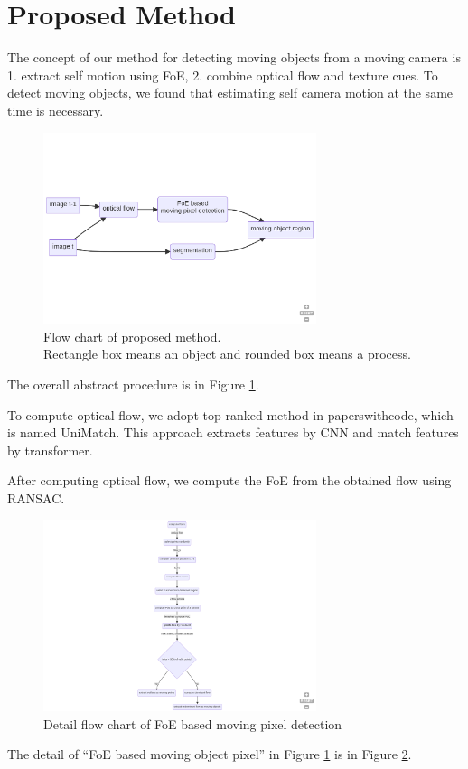 \documentclass[10pt, twocolumn]{article}
\begin{document}
\section{Proposed Method}
The concept of our method for detecting moving objects from a moving camera is 1. extract self motion using FoE, 2. combine optical flow and texture cues.
To detect moving objects, we found that estimating self camera motion at the same time is necessary.
\begin{figure}[ht]
  \centering
  \includegraphics[width=8cm]{fig/wholeflow.png}
  \caption{Flow chart of proposed method.\\
    Rectangle box means an object and rounded box means a process.}
  \label{fig:wholeflow}
\end{figure}
The overall abstract procedure is in Figure \ref{fig:wholeflow}.

To compute optical flow, we adopt top ranked method in paperswithcode, which is named UniMatch\cite{xu2022unifying}.
This approach extracts features by CNN and match features by transformer.

After computing optical flow, we compute the FoE from the obtained flow using RANSAC.
\begin{figure}[ht]
  \centering
  \includegraphics[width=8cm]{fig/foeflow.png}
  \caption{Detail flow chart of FoE based moving pixel detection}
  \label{fig:foeflow}
\end{figure}
The detail of ``FoE based moving object pixel'' in Figure \ref{fig:wholeflow} is in Figure \ref{fig:foeflow}.
\end{document}
